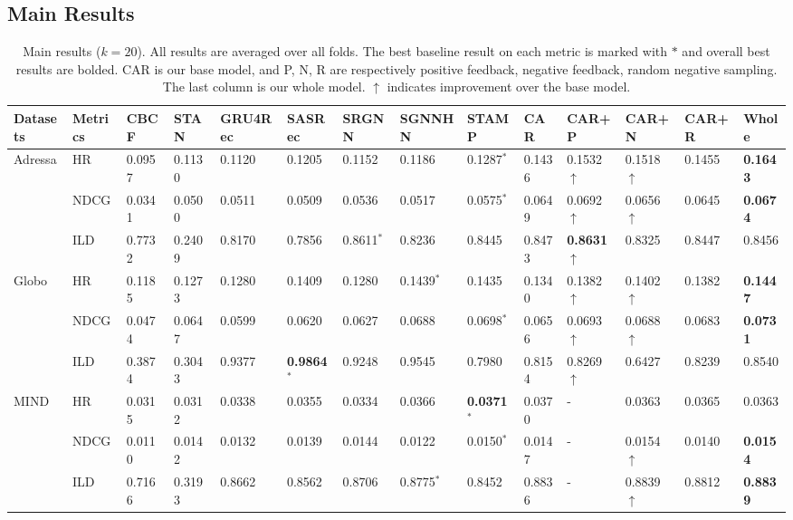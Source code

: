 \subsection{Main Results}
\label{sec:mainres}
\begin{table}[th]\setlength{\tabcolsep}{2.5pt}
\caption{Main results ($k=20$). All results are averaged over all folds. The best baseline result on 
each metric is marked with $*$ and overall best results are bolded. 
CAR is our base model, and P, N, R are respectively positive feedback, negative feedback, 
random negative sampling. The last column is our whole model. 
$\uparrow$ indicates improvement over the base model.}
  \label{performance-table}
  \begin{threeparttable}
  \centering
  \begin{tabular}{p{1.2cm}<{\centering}p{1.1cm}<{\centering}|p{0.8cm}<{\centering}p{0.8cm}<{\centering}p{1.2cm}<{\centering}p{1.2cm}<{\centering}p{1.2cm}<{\centering}p{1.3cm}<{\centering}p{1.1cm}<{\centering}|p{1.1cm}<{\centering}p{1.1cm}<{\centering}p{1.1cm}<{\centering}p{1.1cm}<{\centering}p{1.1cm}<{\centering}}
  \toprule
  Datasets&Metrics&CBCF&STAN&GRU4Rec&SASRec&SRGNN&SGNNHN&STAMP&CAR&CAR+P&CAR+N&CAR+R&Whole \\ 
  \midrule
  \multirow{3}{*}{Adressa} & HR & 0.0957 & 0.1130 & 0.1120 & 0.1205 & 0.1152 & 0.1186 & 0.1287$^*$ & 0.1436 & 0.1532$\uparrow$ & 0.1518$\uparrow$ & 0.1455 & \textbf{0.1643} \\ 
  \cline{2-14}
  & NDCG & 0.0341 & 0.0500 & 0.0511 & 0.0509 & 0.0536 & 0.0517 & 0.0575$^*$ & 0.0649 & 0.0692$\uparrow$ & 0.0656$\uparrow$ & 0.0645 & \textbf{0.0674} \\ 
  \cline{2-14}
  & ILD & 0.7732 & 0.2409 & 0.8170 & 0.7856 & 0.8611$^*$ & 0.8236 & 0.8445 & 0.8473 & \textbf{0.8631}$\uparrow$ & 0.8325 & 0.8447 & 0.8456\\ 
  \midrule
  \multirow{3}{*}{Globo} & HR & 0.1185 & 0.1273 & 0.1280 & 0.1409 & 0.1280 & 0.1439$^*$ & 0.1435 & 0.1340 & 0.1382$\uparrow$ & 0.1402$\uparrow$ & 0.1382 & \textbf{0.1447}\\ 
  \cline{2-14}
  & NDCG & 0.0474 & 0.0647 & 0.0599 & 0.0620 & 0.0627 & 0.0688 & 0.0698$^*$ & 0.0656 & 0.0693$\uparrow$ & 0.0688$\uparrow$ & 0.0683 & \textbf{0.0731}\\ 
  \cline{2-14}
  & ILD & 0.3874 & 0.3043 & 0.9377 & \textbf{0.9864}$^*$ & 0.9248 & 0.9545 & 0.7980 & 0.8154 & 0.8269$\uparrow$ & 0.6427 & 0.8239 & 0.8540\\ 
  \midrule
  \multirow{3}{*}{MIND} & HR & 0.0315 & 0.0312 & 0.0338 & 0.0355 & 0.0334 & 0.0366 & \textbf{0.0371}$^*$ & 0.0370 & - & 0.0363 & 0.0365 & 0.0363\\ 
  \cline{2-14}
  & NDCG & 0.0110 & 0.0142 & 0.0132 & 0.0139 & 0.0144 & 0.0122 & 0.0150$^*$ & 0.0147 & - & 0.0154$\uparrow$ & 0.0140 & \textbf{0.0154}\\
  \cline{2-14} 
  & ILD & 0.7166 & 0.3193 & 0.8662 & 0.8562 & 0.8706 & 0.8775$^*$ & 0.8452 & 0.8836 & -  & 0.8839$\uparrow$ & 0.8812 & \textbf{0.8839}\\ 
  \bottomrule
\end{tabular}
\end{threeparttable}
\end{table}

